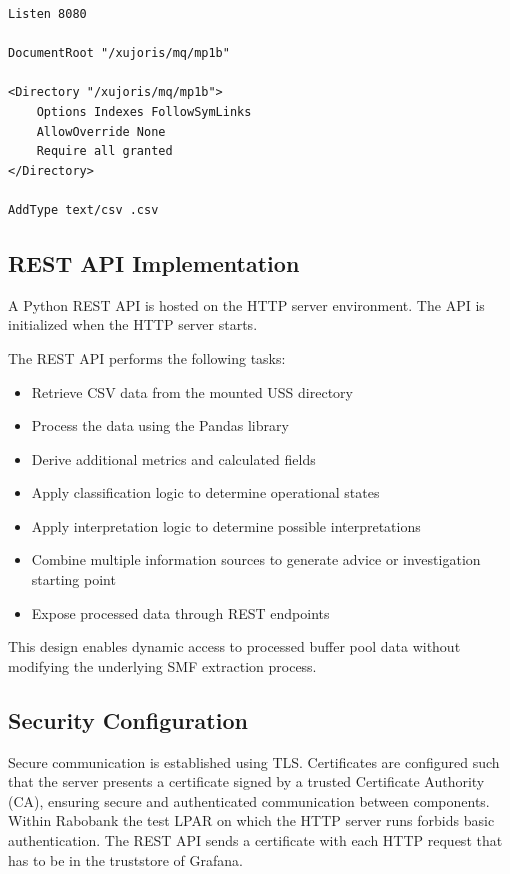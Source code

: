 \begin{listing}[h]
\caption{HTTP server config file}
\label{lst:http-conf}
\begin{verbatim}
Listen 8080

DocumentRoot "/xujoris/mq/mp1b"

<Directory "/xujoris/mq/mp1b">
    Options Indexes FollowSymLinks
    AllowOverride None
    Require all granted
</Directory>

AddType text/csv .csv
\end{verbatim}
\end{listing}


\subsection{REST API Implementation}

A Python REST API is hosted on the HTTP server environment. The API is initialized when the HTTP server starts.

The REST API performs the following tasks:

\begin{itemize}
    \item Retrieve CSV data from the mounted USS directory
    \item Process the data using the Pandas library
    \item Derive additional metrics and calculated fields
    \item Apply classification logic to determine operational states
    \item Apply interpretation logic to determine possible interpretations
    \item Combine multiple information sources to generate advice or investigation starting point
    \item Expose processed data through REST endpoints
\end{itemize}

This design enables dynamic access to processed buffer pool data without modifying the underlying SMF extraction process.

\subsection{Security Configuration}

Secure communication is established using TLS. Certificates are configured such that the server presents a certificate signed by a trusted Certificate Authority (CA), ensuring secure and authenticated communication between components. Within Rabobank the test LPAR on which the HTTP server runs forbids basic authentication. The REST API sends a certificate with each HTTP request that has to be in the truststore of Grafana.


